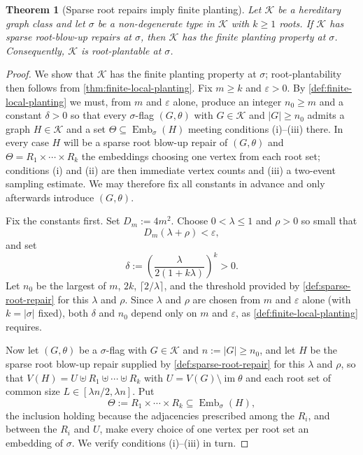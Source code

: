 \documentclass[11pt]{article}
\newtheorem{theorem}{Theorem}
\theoremstyle{definition}
\newcommand{\K}{\mathcal{K}}
\newcommand{\Emb}{\operatorname{Emb}}
\newcommand{\eps}{\varepsilon}
\begin{document}
\begin{theorem}[Sparse root repairs imply finite planting]\label{thm:sparse-repair-planting}
Let $\K$ be a hereditary graph class and let $\sigma$ be a non-degenerate type
in $\K$ with $k\ge1$ roots.  If $\K$ has sparse root-blow-up repairs
at $\sigma$, then $\K$ has the finite planting property at $\sigma$.
Consequently, $\K$ is root-plantable at $\sigma$.
\end{theorem}

\begin{proof}
We show that $\K$ has the finite planting property at $\sigma$;
root-plantability then follows from \cref{thm:finite-local-planting}.  Fix
$m\ge k$ and $\eps>0$.  By \cref{def:finite-local-planting} we must, from $m$ and
$\eps$ alone, produce an integer $n_0\ge m$ and a constant $\delta>0$ so that every
$\sigma$-flag $(G,\theta)$ with $G\in\K$ and $|G|\ge n_0$ admits a graph $H\in\K$
and a set $\Theta\subseteq\Emb_\sigma(H)$ meeting conditions (i)--(iii) there.  In
every case $H$ will be a sparse root blow-up repair of $(G,\theta)$ and
$\Theta=R_1\times\cdots\times R_k$ the embeddings choosing one vertex from each root
set; conditions (i) and (ii) are then immediate vertex counts and (iii) a two-event
sampling estimate.  We may therefore fix all constants in advance and only afterwards
introduce $(G,\theta)$.

Fix the constants first.  Set $D_m:=4m^2$.  Choose
$0<\lambda\le1$ and $\rho>0$ so small that
\[
  D_m(\lambda+\rho)<\eps ,
\]
and set
\[
  \delta:=\left(\frac{\lambda}{2(1+k\lambda)}\right)^k>0 .
\]
Let $n_0$ be the largest of $m$, $2k$, $\lceil2/\lambda\rceil$, and the threshold
provided by \cref{def:sparse-root-repair} for this $\lambda$ and $\rho$.  Since
$\lambda$ and $\rho$ are chosen from $m$ and $\eps$ alone (with $k=|\sigma|$ fixed),
both $\delta$ and $n_0$ depend only on $m$ and $\eps$, as
\cref{def:finite-local-planting} requires.

Now let $(G,\theta)$ be a $\sigma$-flag with $G\in\K$ and $n:=|G|\ge n_0$, and let
$H$ be the sparse root blow-up repair supplied by \cref{def:sparse-root-repair} for
this $\lambda$ and $\rho$, so that $V(H)=U\uplus R_1\uplus\cdots\uplus R_k$ with
$U=V(G)\setminus\operatorname{im}\theta$ and each root set of common size
$L\in[\lambda n/2,\lambda n]$.  Put
\[
  \Theta:=R_1\times\cdots\times R_k\subseteq\Emb_\sigma(H),
\]
the inclusion holding because the adjacencies prescribed among the $R_i$, and between
the $R_i$ and $U$, make every choice of one vertex per root set an embedding of
$\sigma$.  We verify conditions (i)--(iii) in turn.


\end{proof}
\end{document}
